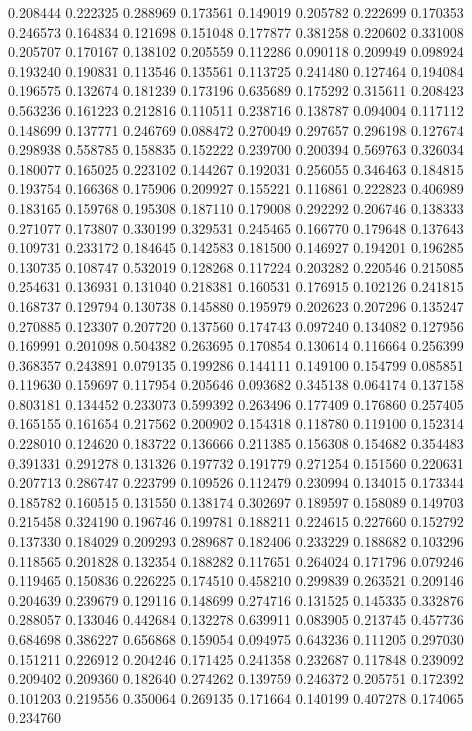0.208444
0.222325
0.288969
0.173561
0.149019
0.205782
0.222699
0.170353
0.246573
0.164834
0.121698
0.151048
0.177877
0.381258
0.220602
0.331008
0.205707
0.170167
0.138102
0.205559
0.112286
0.090118
0.209949
0.098924
0.193240
0.190831
0.113546
0.135561
0.113725
0.241480
0.127464
0.194084
0.196575
0.132674
0.181239
0.173196
0.635689
0.175292
0.315611
0.208423
0.563236
0.161223
0.212816
0.110511
0.238716
0.138787
0.094004
0.117112
0.148699
0.137771
0.246769
0.088472
0.270049
0.297657
0.296198
0.127674
0.298938
0.558785
0.158835
0.152222
0.239700
0.200394
0.569763
0.326034
0.180077
0.165025
0.223102
0.144267
0.192031
0.256055
0.346463
0.184815
0.193754
0.166368
0.175906
0.209927
0.155221
0.116861
0.222823
0.406989
0.183165
0.159768
0.195308
0.187110
0.179008
0.292292
0.206746
0.138333
0.271077
0.173807
0.330199
0.329531
0.245465
0.166770
0.179648
0.137643
0.109731
0.233172
0.184645
0.142583
0.181500
0.146927
0.194201
0.196285
0.130735
0.108747
0.532019
0.128268
0.117224
0.203282
0.220546
0.215085
0.254631
0.136931
0.131040
0.218381
0.160531
0.176915
0.102126
0.241815
0.168737
0.129794
0.130738
0.145880
0.195979
0.202623
0.207296
0.135247
0.270885
0.123307
0.207720
0.137560
0.174743
0.097240
0.134082
0.127956
0.169991
0.201098
0.504382
0.263695
0.170854
0.130614
0.116664
0.256399
0.368357
0.243891
0.079135
0.199286
0.144111
0.149100
0.154799
0.085851
0.119630
0.159697
0.117954
0.205646
0.093682
0.345138
0.064174
0.137158
0.803181
0.134452
0.233073
0.599392
0.263496
0.177409
0.176860
0.257405
0.165155
0.161654
0.217562
0.200902
0.154318
0.118780
0.119100
0.152314
0.228010
0.124620
0.183722
0.136666
0.211385
0.156308
0.154682
0.354483
0.391331
0.291278
0.131326
0.197732
0.191779
0.271254
0.151560
0.220631
0.207713
0.286747
0.223799
0.109526
0.112479
0.230994
0.134015
0.173344
0.185782
0.160515
0.131550
0.138174
0.302697
0.189597
0.158089
0.149703
0.215458
0.324190
0.196746
0.199781
0.188211
0.224615
0.227660
0.152792
0.137330
0.184029
0.209293
0.289687
0.182406
0.233229
0.188682
0.103296
0.118565
0.201828
0.132354
0.188282
0.117651
0.264024
0.171796
0.079246
0.119465
0.150836
0.226225
0.174510
0.458210
0.299839
0.263521
0.209146
0.204639
0.239679
0.129116
0.148699
0.274716
0.131525
0.145335
0.332876
0.288057
0.133046
0.442684
0.132278
0.639911
0.083905
0.213745
0.457736
0.684698
0.386227
0.656868
0.159054
0.094975
0.643236
0.111205
0.297030
0.151211
0.226912
0.204246
0.171425
0.241358
0.232687
0.117848
0.239092
0.209402
0.209360
0.182640
0.274262
0.139759
0.246372
0.205751
0.172392
0.101203
0.219556
0.350064
0.269135
0.171664
0.140199
0.407278
0.174065
0.234760
